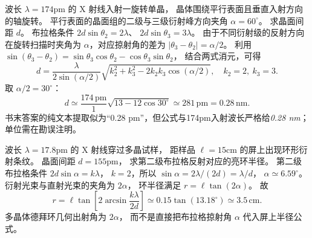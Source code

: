 波长
$\lambda=174$pm 的 X 射线入射一旋转单晶，
晶体围绕平行表面且垂直入射方向的轴旋转。
平行表面的晶面组的二级与三级衍射峰方向夹角
$\alpha=60^\circ$。
求晶面间距 $d$。
\exsolution
布拉格条件
$2d\sin\theta_2=2\lambda$、
$2d\sin\theta_3=3\lambda$。
由于不同衍射级的反射方向在旋转扫描时夹角为
$\alpha$，对应掠射角的差为
$|\theta_3-\theta_2|=\alpha/2$。
利用
$\sin(\theta_3-\theta_2)
=\sin\theta_3\cos\theta_2-\cos\theta_3\sin\theta_2$，
结合两式消元，可得
\[
\boxed{d=
\frac{\lambda}{2\sin(\alpha/2)}
\sqrt{k_2^2+k_3^2-2k_2k_3\cos(\alpha/2)}},
\quad k_2=2,\ k_3=3.
\]
取 $\alpha/2=30^\circ$：
\[
\boxed{d\simeq
\frac{174\,\mathrm{pm}}{1}
\sqrt{13-12\cos30^\circ}
\simeq281\,\mathrm{pm}
=0.28\,\mathrm{nm}}.
\]
\excheck 书末答案的纯文本提取似为“0.28 pm”，但公式与174pm入射波长严格给\emph{0.28 nm}；单位需在勘误注明。

波长
$\lambda=17.8$pm 的 X 射线穿过多晶试样，
距样品 $\ell=15$cm 的屏上出现环形衍射条纹。
晶面间距
$d=155$pm，
求第二级布拉格反射对应的亮环半径。
\exsolution
第二级布拉格条件
$2d\sin\alpha=k\lambda$，
$k=2$，所以
$\sin\alpha=2\lambda/(2d)=\lambda/d$，
$\alpha\simeq6.59^\circ$。
衍射光束与直射光束的夹角为
$2\alpha$，
环半径满足
$r=\ell\tan(2\alpha)$。
故
\[
\boxed{r=\ell
\tan\left[2\arcsin\frac{k\lambda}{2d}\right]
\simeq0.15\tan(13.18^\circ)
\simeq3.5\,\mathrm{cm}}.
\]
\excheck 多晶体德拜环几何出射角为 $2\alpha$，
而不是直接把布拉格掠射角 $\alpha$ 代入屏上半径公式。
